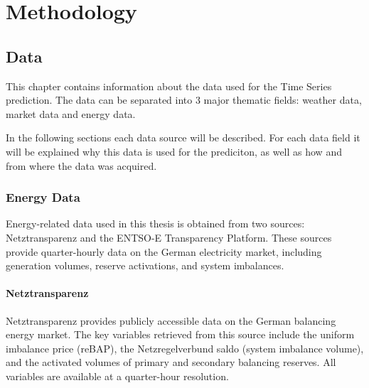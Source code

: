 \documentclass[class=scrbook, crop=false]{standalone}
\begin{document}
\chapter{Methodology} %
\label{Chapter::Methodology}

\section{Data}
\label{Chapter::Data}
This chapter contains information about the data used for the Time Series prediction. 
The data can be separated into 3 major thematic fields: weather data, market data and energy data.

In the following sections each data source will be described. 
For each data field it will be explained why this data is used for the prediciton, as well as  how and from where the data was acquired.



\subsection{Energy Data}
\label{Section::Energy_Data}

Energy-related data used in this thesis is obtained from two sources: Netztransparenz and the ENTSO-E Transparency Platform. 
These sources provide quarter-hourly data on the German electricity market, including generation volumes, reserve activations, and system imbalances.
\subsubsection{Netztransparenz}

Netztransparenz provides publicly accessible data on the German balancing energy market. The key variables retrieved from this source include the uniform imbalance price (reBAP), the Netzregelverbund saldo (system imbalance volume), and the activated volumes of primary and secondary balancing reserves. All variables are available at a quarter-hour resolution.
\end{document}
